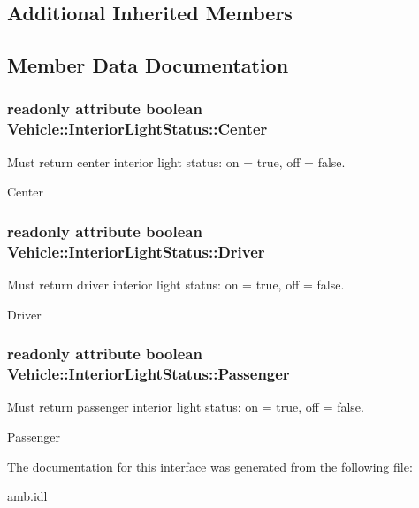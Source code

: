 \subsection*{Additional Inherited Members}


\subsection{Member Data Documentation}
\hypertarget{interfaceVehicle_1_1InteriorLightStatus_a86ef8e7a3d63b4b5ecbe91c7874b5067}{
\subsubsection[{Center}]{\setlength{\rightskip}{0pt plus 5cm}readonly attribute boolean Vehicle\-::\-Interior\-Light\-Status\-::\-Center}}\label{interfaceVehicle_1_1InteriorLightStatus_a86ef8e7a3d63b4b5ecbe91c7874b5067}


Must return center interior light status\-: on = true, off = false. 

Center \hypertarget{interfaceVehicle_1_1InteriorLightStatus_a279c4729a24c08ac31a34cf6ca773688}{
\subsubsection[{Driver}]{\setlength{\rightskip}{0pt plus 5cm}readonly attribute boolean Vehicle\-::\-Interior\-Light\-Status\-::\-Driver}}\label{interfaceVehicle_1_1InteriorLightStatus_a279c4729a24c08ac31a34cf6ca773688}


Must return driver interior light status\-: on = true, off = false. 

Driver \hypertarget{interfaceVehicle_1_1InteriorLightStatus_a22dca79c58a432b25241dd025ce27cd8}{
\subsubsection[{Passenger}]{\setlength{\rightskip}{0pt plus 5cm}readonly attribute boolean Vehicle\-::\-Interior\-Light\-Status\-::\-Passenger}}\label{interfaceVehicle_1_1InteriorLightStatus_a22dca79c58a432b25241dd025ce27cd8}


Must return passenger interior light status\-: on = true, off = false. 

Passenger 

The documentation for this interface was generated from the following file\-:\begin{DoxyCompactItemize}
\item 
amb.\-idl\end{DoxyCompactItemize}
